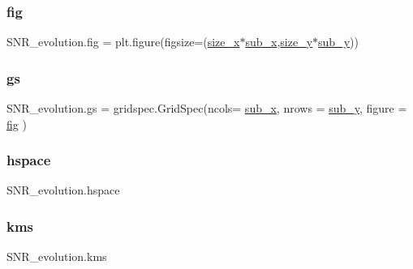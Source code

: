 \subsubsection{\texorpdfstring{fig}{fig}}
{\footnotesize\ttfamily S\+N\+R\+\_\+evolution.\+fig = plt.\+figure(figsize=(\hyperlink{namespaceSNR__evolution_a1190521b88fe27a62233af96b1bac53a}{size\+\_\+x}$\ast$\hyperlink{namespaceSNR__evolution_a84d8239381bb2eaf5f5de4124c953059}{sub\+\_\+x},\hyperlink{namespaceSNR__evolution_ac2bd4765206f8c737f95ebab78ae7cac}{size\+\_\+y}$\ast$\hyperlink{namespaceSNR__evolution_ac1b49fa093e424c1d814fab4c4d47db3}{sub\+\_\+y}))}

\mbox{\label{namespaceSNR__evolution_a7c849cab581a2471a15771cfab7a0f6c}} 
\subsubsection{\texorpdfstring{gs}{gs}}
{\footnotesize\ttfamily S\+N\+R\+\_\+evolution.\+gs = gridspec.\+Grid\+Spec(ncols= \hyperlink{namespaceSNR__evolution_a84d8239381bb2eaf5f5de4124c953059}{sub\+\_\+x}, nrows = \hyperlink{namespaceSNR__evolution_ac1b49fa093e424c1d814fab4c4d47db3}{sub\+\_\+y}, figure = \hyperlink{namespaceSNR__evolution_a9cdbf7b3467a14a21b2b5c606e41774a}{fig} )}

\mbox{\label{namespaceSNR__evolution_a2fa00f6ce578b9daa8e1b3bafe699015}} 
\subsubsection{\texorpdfstring{hspace}{hspace}}
{\footnotesize\ttfamily S\+N\+R\+\_\+evolution.\+hspace}

\mbox{\label{namespaceSNR__evolution_ad025ed64eb70952d02f2615f98ced9a1}} 
\subsubsection{\texorpdfstring{kms}{kms}}
{\footnotesize\ttfamily S\+N\+R\+\_\+evolution.\+kms}

